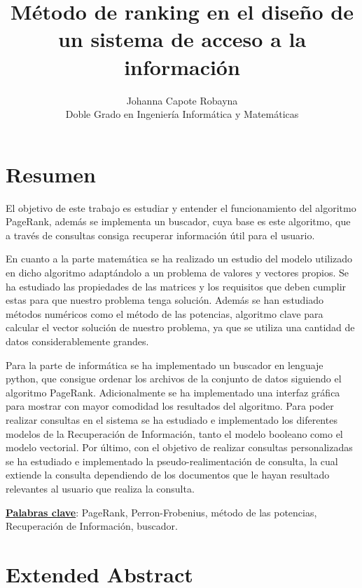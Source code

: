 \documentclass[size=a4, parskip=half, titlepage=false, toc=flat, toc=bib, 12pt]{scrartcl}
\title{Método de ranking en el diseño de un sistema de acceso a la información}
\author{Johanna Capote Robayna\\
    Doble Grado en Ingeniería Informática y Matemáticas}
\date{}
\theoremstyle{theorem-style}
\theoremstyle{definition-style}
\theoremstyle{remark-style}
\theoremstyle{example-style}
\theoremstyle{definition-style}
\theoremstyle{remark-style}
\begin{document}
\maketitle
\thispagestyle{empty}

\newpage
\pagestyle{empty}
\tableofcontents
\clearpage
\pagestyle{headings}
\newpage

\section{Resumen}
El objetivo de este trabajo es estudiar y entender el funcionamiento del algoritmo PageRank, además se implementa un buscador, cuya base es este algoritmo, que a través de consultas consiga recuperar información útil para el usuario.

En cuanto a la parte matemática se ha realizado un estudio del modelo utilizado en dicho algoritmo adaptándolo a un problema de valores y vectores propios. Se ha estudiado las propiedades de las matrices y los requisitos que deben cumplir estas para que nuestro problema tenga solución. Además se han estudiado métodos numéricos como el método de las potencias, algoritmo clave para calcular el vector solución de nuestro problema, ya que se utiliza una cantidad de datos considerablemente grandes.

Para la parte de informática se ha implementado un buscador en lenguaje python, que consigue ordenar los archivos de la conjunto de datos siguiendo el algoritmo PageRank. Adicionalmente se ha implementado una interfaz gráfica para mostrar con mayor comodidad los resultados del algoritmo. Para poder realizar consultas en el sistema se ha estudiado e implementado los diferentes modelos de la Recuperación de Información, tanto el modelo booleano como el modelo vectorial. Por último, con el objetivo de realizar consultas personalizadas se ha estudiado e implementado la pseudo-realimentación de consulta, la cual extiende la consulta dependiendo de los documentos que le hayan resultado relevantes al usuario que realiza la consulta.

\textbf{\underline{Palabras clave}}: PageRank, Perron-Frobenius, método de las potencias, Recuperación de Información, buscador.

\newpage

\section{Extended Abstract}

\newpage
\end{document}
